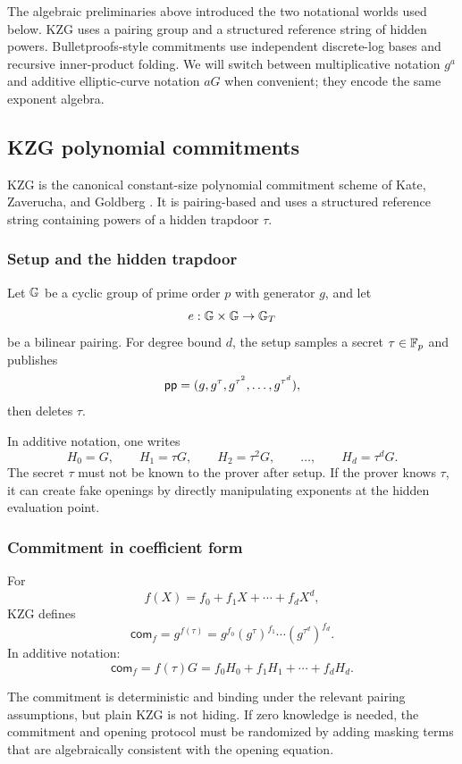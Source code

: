 The algebraic preliminaries above introduced the two notational worlds used below. KZG uses a pairing group and a structured reference string of hidden powers. Bulletproofs-style commitments use independent discrete-log bases and recursive inner-product folding. We will switch between multiplicative notation $g^a$ and additive elliptic-curve notation $aG$ when convenient; they encode the same exponent algebra.

\subsection{KZG polynomial commitments}

KZG is the canonical constant-size polynomial commitment scheme of Kate, Zaverucha, and Goldberg \cite{KateZaveruchaGoldberg2010}. It is pairing-based and uses a structured reference string containing powers of a hidden trapdoor $\tau$.

\subsubsection{Setup and the hidden trapdoor}

Let $\mathbb{G}$ be a cyclic group of prime order $p$ with generator $g$, and let
\[
    e:\mathbb{G}\times\mathbb{G}\to\mathbb{G}_T
\]
be a bilinear pairing. For degree bound $d$, the setup samples a secret $\tau\in\mathbb{F}_p$ and publishes
\[
    \mathsf{pp}=(g,g^\tau,g^{\tau^2},\dots,g^{\tau^d}),
\]
then deletes $\tau$.

In additive notation, one writes
\[
    H_0=G,
    \qquad
    H_1=\tau G,
    \qquad
    H_2=\tau^2G,
    \qquad
    \ldots,
    \qquad
    H_d=\tau^dG.
\]
The secret $\tau$ must not be known to the prover after setup. If the prover knows $\tau$, it can create fake openings by directly manipulating exponents at the hidden evaluation point.

\subsubsection{Commitment in coefficient form}

For
\[
    f(X)=f_0+f_1X+\cdots+f_dX^d,
\]
KZG defines
\[
    \mathsf{com}_f=g^{f(\tau)}
    =g^{f_0}(g^\tau)^{f_1}\cdots (g^{\tau^d})^{f_d}.
\]
In additive notation:
\[
    \mathsf{com}_f=f(\tau)G=f_0H_0+f_1H_1+\cdots+f_dH_d.
\]

The commitment is deterministic and binding under the relevant pairing assumptions, but plain KZG is not hiding. If zero knowledge is needed, the commitment and opening protocol must be randomized by adding masking terms that are algebraically consistent with the opening equation.

